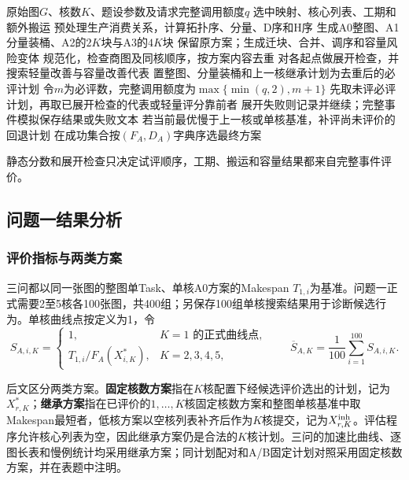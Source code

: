 \begin{algorithm}[H]\caption{问题一有限候选生成与完整评价}
\begin{algorithmic}[1]
\REQUIRE 原始图$G$、核数$K$、题设参数及请求完整调用额度$q$
\ENSURE 选中映射、核心列表、工期和额外搬运
\STATE 预处理生产消费关系，计算拓扑序、分量、D序和H序
\STATE 生成A0整图、A1分量装桶、A2的$2K$块与A3的$4K$块
\STATE 保留原方案；生成迁块、合并、调序和容量风险变体
\STATE 规范化，检查商图及同核顺序，按方案内容去重
\ENDFOR
\STATE 对各起点做展开检查，并搜索轻量改善与容量改善代表
\STATE 置整图、分量装桶和上一核继承计划为去重后的必评计划
\STATE 令$m$为必评数，完整调用额度为$\max\{\min(q,2),m+1\}$
\STATE 先取未评必评计划，再取已展开检查的代表或轻量评分靠前者
\STATE 展开失败则记录并继续；完整事件模拟保存结果或失败文本
\ENDWHILE
\STATE 若当前最优慢于上一核或单核基准，补评尚未评价的回退计划
\STATE 在成功集合按$(F_A,D_A)$字典序选最终方案
\end{algorithmic}\end{algorithm}

静态分数和展开检查只决定试评顺序，工期、搬运和容量结果都来自完整事件评价。

\subsection{问题一结果分析}
\subsubsection{评价指标与两类方案}
三问都以同一张图的整图单Task、单核A0方案的Makespan $T_{1,i}$为基准。问题一正式需要2至5核各100张图，共400组；另保存100组单核搜索结果用于诊断候选行为。单核曲线点按定义为1，令
\begin{equation}
S_{A,i,K}=\begin{cases}
1,&K=1\text{ 的正式曲线点},\\
T_{1,i}/F_A(X^*_{i,K}),&K=2,3,4,5,
\end{cases}\qquad
\overline S_{A,K}=\frac1{100}\sum_{i=1}^{100}S_{A,i,K}.
\label{eq:a-speedup}
\end{equation}


后文区分两类方案。\textbf{固定核数方案}指在$K$核配置下经候选评价选出的计划，记为$X^*_{r,K}$；\textbf{继承方案}指在已评价的$1,\ldots,K$核固定核数方案和整图单核基准中取Makespan最短者，低核方案以空核列表补齐后作为$K$核提交，记为$X^{\rm inh}_{r,K}$。评估程序允许核心列表为空，因此继承方案仍是合法的$K$核计划。三问的加速比曲线、逐图长表和慢例统计均采用继承方案；同计划配对和A/B固定计划对照采用固定核数方案，并在表题中注明。

